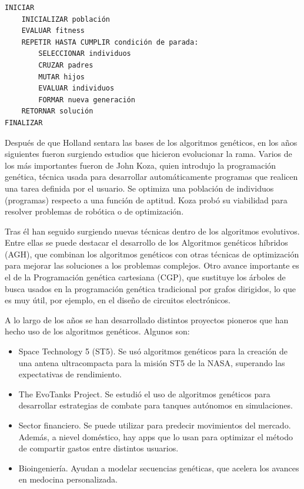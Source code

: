 \begin{lstlisting}[caption=Algoritmo Genético]
INICIAR
    INICIALIZAR población
    EVALUAR fitness
    REPETIR HASTA CUMPLIR condición de parada:
        SELECCIONAR individuos
        CRUZAR padres
        MUTAR hijos
        EVALUAR individuos
        FORMAR nueva generación
    RETORNAR solución
FINALIZAR
\end{lstlisting}

Después de que Holland sentara las bases de los algoritmos genéticos, en los años siguientes fueron surgiendo estudios que hicieron evolucionar la rama. Varios de los más importantes fueron de John Koza, quien introdujo la programación genética, técnica usada para desarrollar automáticamente programas que realicen una tarea definida por el usuario. Se optimiza una población de individuos (programas) respecto a una función de aptitud. Koza probó su viabilidad para resolver problemas de robótica o de optimización.

Tras él han seguido surgiendo nuevas técnicas dentro de los algoritmos evolutivos. Entre ellas se puede destacar el desarrollo de los Algoritmos genéticos híbridos (AGH), que combinan los algoritmos genéticos con otras técnicas de optimización para mejorar las soluciones a los problemas complejos. Otro avance importante es el de la Programación genética cartesiana (CGP), que sustituye los árboles de busca usados en la programación genética tradicional por grafos dirigidos, lo que es muy útil, por ejemplo, en el diseño de circuitos electrónicos.

A lo largo de los años se han desarrollado distintos proyectos pioneros que han hecho uso de los algoritmos genéticos. Algunos son:

\begin{itemize}
    \item Space Technology 5 (ST5). Se usó algoritmos genéticos para la creación de una antena ultracompacta para la misión ST5 de la NASA, superando las expectativas de rendimiento.
    \item The EvoTanks Project. Se estudió el uso de algoritmos genéticos para desarrollar estrategias de combate para tanques autónomos en simulaciones.
    \item Sector financiero. Se puede utilizar para predecir movimientos del mercado. Además, a nievel doméstico, hay apps que lo usan para optimizar el método de compartir gastos entre distintos usuarios.
    \item Bioingeniería. Ayudan a modelar secuencias genéticas, que acelera los avances en medocina personalizada.
\end{itemize}


